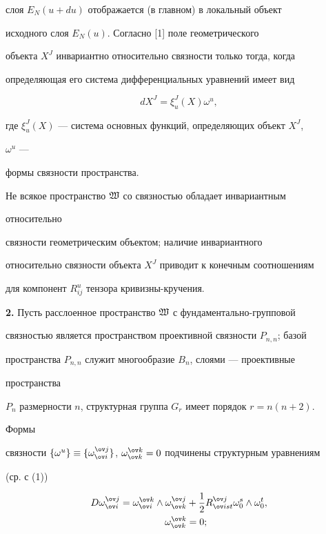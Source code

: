 слоя $E_N(u+du)$ отображается (в главном) в локальный объект 


исходного слоя $E_N(u)$. Согласно [1] поле геометрического 


объекта $X^J$ инвариантно относительно связности только тогда, когда 


определяющая его система дифференциальных уравнений имеет вид 


\begin{equation} 


dX^J=\xi^J_u(X)\omega^u, 


\end{equation} 


где $\xi^J_u(X)$ --- система основных функций, определяющих объект $X^J$, 


$\omega^u$ --- 


формы связности пространства. 


 


Не всякое пространство $\frak W$ со связностью обладает инвариантным 


относительно 


связности геометрическим объектом; наличие инвариантного 


относительно связности объекта $X^J$ приводит к конечным соотношениям 


для компонент $R^u_{ij}$ тензора кривизны-кручения. 


\medskip 


 


{\bf 2.} Пусть расслоенное пространство $\frak W$ с фундаментально-групповой 


связностью является пространством проективной связности $P_{n,n}$; базой 


пространства $P_{n,n}$ служит многообразие $B_n$, слоями --- проективные 


пространства 


$P_n$ размерности $n$, структурная группа $G_r$ имеет порядок $r=n(n+2)$. 


Формы 


связности $\{\omega^u\}\equiv\{\omega^{\ov j}_{\ov i}\}$, $\omega^{\ov 


k}_{\ov k}=0$ подчинены структурным уравнениям 


(ср. с (1)) 


\begin{equation} 


\begin{split} 


D\omega^{\ov j}_{\ov i}=\omega^{\ov k}_{\ov i}\wedge 


\omega^{\ov j}_{\ov k}&+\frac{1}{2}R^{\ov j}_{\ov i st} 


\omega^s_0\wedge\omega^t_0, \\ 


\omega^{\ov k}_{\ov k}&=0; 


\end{split} 


\end{equation} 


